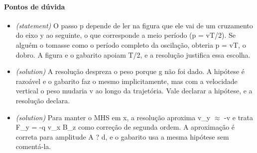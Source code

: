 \documentclass{article}%
\begin{document}
\paragraph{Pontos de dúvida}%
\begin{itemize}%
\item%
\textit{(statement)} O passo p depende de ler na figura que ele vai de um cruzamento do eixo y ao seguinte, o que corresponde a meio período (p = vT/2). Se alguém o tomasse como o período completo da oscilação, obteria p = vT, o dobro. A figura e o gabarito apoiam T/2, e a resolução justifica essa escolha.%
\item%
\textit{(solution)} A resolução despreza o peso porque g não foi dado. A hipótese é razoável e o gabarito faz o mesmo implicitamente, mas com a velocidade vertical o peso mudaria v ao longo da trajetória. Vale declarar a hipótese, e a resolução declara.%
\item%
\textit{(solution)} Para manter o MHS em x, a resolução aproxima v\_y $\approx$ -v e trata F\_y = -q v\_x B\_z como correção de segunda ordem. A aproximação é correta para amplitude A ? d, e o gabarito usa a mesma hipótese sem comentá{-}la.%
\end{itemize}%
\end{document}
